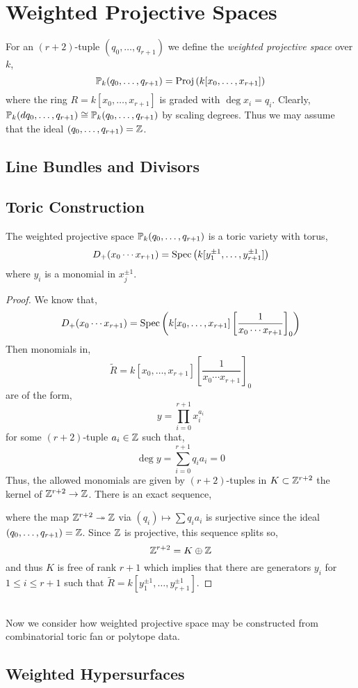 \documentclass[12pt]{article}
\begin{document}
\section{Weighted Projective Spaces}

\begin{defn}
For an $(r+2)$-tuple $(q_0, \dots, q_{r+1})$ we define the \textit{weighted projective space} over $k$,
\[ \P_k(q_0, \dots, q_{r+1}) = \Proj{k[x_0, \dots, x_{r+1}]} \]
where the ring $R = k[x_0, \dots, x_{r+1}]$ is graded with $\deg{x_i} = q_i$. Clearly, $\P_k(d q_0, \dots, q_{r+1}) \cong \P_k(q_0, \dots, q_{r+1})$ by scaling degrees. Thus we may assume that the ideal $(q_0, \dots, q_{r+1}) = \Z$.
\end{defn}

\subsection{Line Bundles and Divisors}

\subsection{Toric Construction}

\begin{prop}
The weighted projective space $\P_k(q_0, \dots, q_{r+1})$ is a toric variety with torus,
\[ D_+(x_0 \cdots x_{r+1}) = \Spec{k[y_1^{\pm 1}, \dots, y_{r+1}^{\pm 1}]} \]
where $y_i$ is a monomial in $x_j^{\pm 1}$. 
\end{prop}

\begin{proof}
We know that,
\[ D_+(x_0 \cdots x_{r+1}) = \Spec{k[x_0, \dots, x_{r+1}] \left[ \frac{1}{x_0 \cdots x_{r+1}} \right]_{0}} \]
Then monomials in, 
\[ \tilde{R} = k[x_0, \dots, x_{r+1}] \left[ \frac{1}{x_0 \cdots x_{r+1}} \right]_{0} \]
are of the form,
\[ y = \prod_{i = 0}^{r+1} x_i^{a_i} \]
for some $(r+2)$-tuple $a_i \in \Z$ such that,
\[ \deg{y} = \sum_{i = 0}^{r + 1} q_i a_i = 0 \]
Thus, the allowed monomials are given by $(r+2)$-tuples in $K \subset \Z^{r+2}$ the kernel of $\Z^{r+2} \to \Z$. There is an exact sequence,
\begin{center}
\end{center}
where the map $\Z^{r+2} \onto \Z$ via $(q_i) \mapsto \sum q_i a_i$ is surjective since the ideal $(q_0, \dots, q_{r+1}) = \Z$. Since $\Z$ is projective, this sequence splits so,
\[ \Z^{r + 2} = K \oplus \Z \]
and thus $K$ is free of rank $r + 1$ which implies that there are generators $y_i$ for $1 \le i \le r + 1$ such that $\tilde{R} = k[y_1^{\pm 1}, \dots, y_{r+1}^{\pm 1}]$.
\end{proof}
\noindent\\
Now we consider how weighted projective space may be constructed from combinatorial toric fan or polytope data. 

\subsection{Weighted Hypersurfaces}
\end{document}
